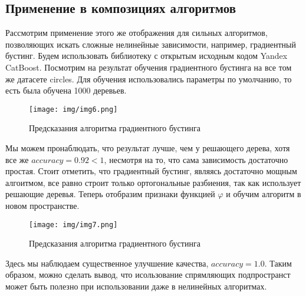 \documentclass[twoside,twocolumn]{article}
\theoremstyle{plain}
\theoremstyle{definition}
\begin{document}
\subsection{Применение в композициях алгоритмов}
Рассмотрим применение этого же отображения для сильных алгоритмов, позволяющих искать сложные нелинейные зависимости, например, градиентный
бустинг. Будем использовать библиотеку с открытым исходным кодом Yandex CatBoost. Посмотрим на результат обучения градиентного бустинга
на все том же датасете circles. Для обучения использовались параметры по умолчанию, то есть была обучена 1000 деревьев.
\begin{figure}[!h]
  \caption{Предсказания алгоритма градиентного бустинга}
  \centering
  \texttt{[image: img/img6.png]}
  \label{fig:circles6}
\end{figure}
Мы можем пронаблюдать, что результат лучше, чем у решающего дерева, хотя все же $accuracy = 0.92 < 1$, несмотря на то, что сама зависимость
достаточно простая. Стоит отметить, что градиентный бустинг, являясь достаточно мощным алгоитмом, все равно строит только ортогональные разбиения,
так как использует решающие деревья. Теперь отобразим признаки функцией $\varphi$ и обучим алгоритм в новом пространстве.
\begin{figure}[!h]
  \caption{Предсказания алгоритма градиентного бустинга}
  \centering
  \texttt{[image: img/img7.png]}
  \label{fig:circles7}
\end{figure}
 Здесь мы наблюдаем существенное улучшение качества, $accuracy = 1.0$. Таким образом, можно сделать вывод, что исользование спрямляющих подпространст может
 быть полезно при использовании даже в нелинейных алгоритмах.
\end{document}
